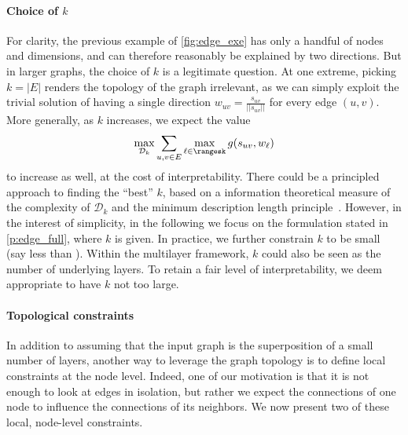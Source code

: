 \paragraph{Choice of $k$}
\label{par:edge_choose_k}

For clarity, the previous example of \autoref{fig:edge_exe} has only a handful of nodes and
dimensions, and can therefore reasonably be explained by two directions. But in larger graphs, the
choice of $k$ is a legitimate question.
At one extreme, picking $k=|E|$ renders the topology of the graph
irrelevant, as we can simply exploit the trivial
solution of having a single direction $w_{uv} = \frac{s_{uv}}{||s_{uv}||}$ for every edge $(u,v)$.
More generally, as $k$ increases, we expect the value \[\max_{\mathcal{D}_k} \sum_{u,v \in E}
\max_{\ell \in \rangesk} g(s_{uv}, w_{\ell})\] to increase as
well, at the cost of interpretability. There could be a principled approach to finding the
\enquote{best} $k$, based on a information theoretical measure of the complexity of $\mathcal{D}_k$
and the minimum description length principle~\autocite{grunwald2005tutorial}. However, in the
interest of simplicity, in the following we focus on the formulation stated in
\autoref{p:edge_full}, where $k$ is given. In practice, we further constrain $k$ to be small (say
less than ). Within the multilayer framework, $k$ could also be seen as the number of
underlying layers. To retain a fair level of interpretability, we deem appropriate to have $k$ not
too large.

\paragraph{Topological constraints}

In addition to assuming that the input graph is the superposition of a small number of layers,
another way to leverage the graph topology is to define local constraints at the node level.
Indeed, one of our motivation is that it is not enough to look at edges in isolation, but rather we
expect the connections of one node to influence the connections of its neighbors. We now present two
of these local, node-level constraints. 

